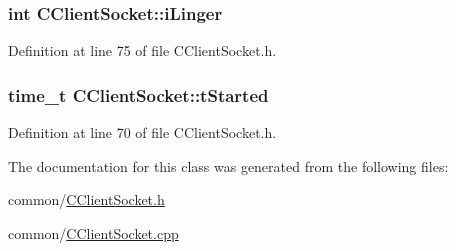 \hypertarget{class_c_client_socket_af33729182418c1e9868ad0fed1a68a1e}{
\subsubsection[{i\-Linger}]{\setlength{\rightskip}{0pt plus 5cm}int {\bf \-C\-Client\-Socket\-::i\-Linger}}}\label{class_c_client_socket_af33729182418c1e9868ad0fed1a68a1e}


\-Definition at line 75 of file \-C\-Client\-Socket.\-h.

\hypertarget{class_c_client_socket_a64622c72994fb5bcacb0f9e1adf3f080}{
\subsubsection[{t\-Started}]{\setlength{\rightskip}{0pt plus 5cm}time\-\_\-t {\bf \-C\-Client\-Socket\-::t\-Started}}}\label{class_c_client_socket_a64622c72994fb5bcacb0f9e1adf3f080}


\-Definition at line 70 of file \-C\-Client\-Socket.\-h.



\-The documentation for this class was generated from the following files\-:\begin{DoxyCompactItemize}
\item 
common/\hyperlink{_c_client_socket_8h}{\-C\-Client\-Socket.\-h}\item 
common/\hyperlink{_c_client_socket_8cpp}{\-C\-Client\-Socket.\-cpp}\end{DoxyCompactItemize}
